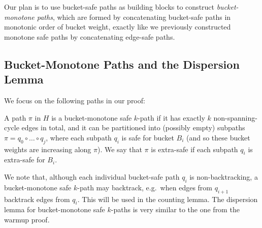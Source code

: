 \documentclass{theoretics}
\begin{document}
Our plan is to use bucket-safe paths as building blocks to construct \emph{bucket-monotone paths}, which are formed by concatenating bucket-safe paths in monotonic order of bucket weight, exactly like we previously constructed monotone safe paths by concatenating edge-safe paths.

\subsection{Bucket-Monotone Paths and the Dispersion Lemma}

We focus on the following paths in our proof:
\begin{definition} 
A path $\pi$ in $H$ is a bucket-monotone safe $k$-path if it has exactly $k$ non-spanning-cycle edges in total, and it can be partitioned into (possibly empty) subpaths $\pi = q_0 \circ \dots \circ q_j$, where each subpath $q_i$ is safe for bucket $B_i$ (and so these bucket weights are increasing along $\pi$).
We say that $\pi$ is extra-safe if each subpath $q_i$ is extra-safe for $B_i$.
\end{definition}

We note that, although each individual bucket-safe path $q_i$ is non-backtracking, a bucket-monotone safe $k$-path may backtrack, e.g.\ when edges from $q_{i+1}$ backtrack edges from $q_i$.
This will be used in the counting lemma.
The dispersion lemma for bucket-monotone safe $k$-paths is very similar to the one from the warmup proof.
\end{document}
